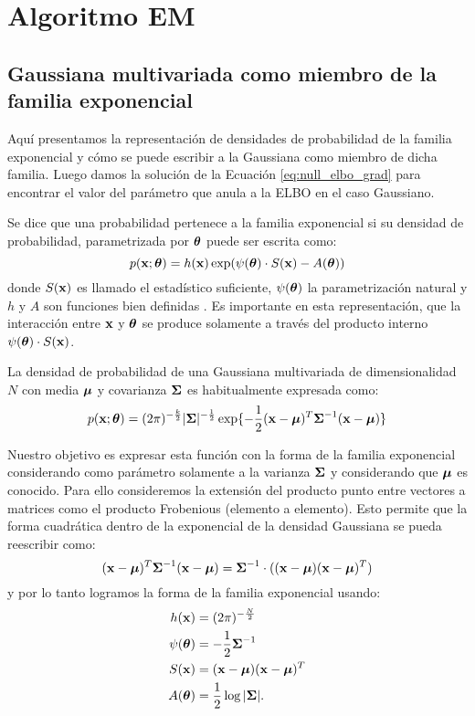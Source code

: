 \chapter{Algoritmo EM}
\section{Gaussiana multivariada como miembro de la familia exponencial}\label{appendix:exp_family}

Aquí presentamos la representación de densidades de probabilidad de la familia exponencial y cómo se puede escribir a la Gaussiana como miembro de dicha familia. Luego damos la solución de la Ecuación \ref{eq:null_elbo_grad} para encontrar el valor del parámetro que anula a la ELBO en el caso Gaussiano.

Se dice que una probabilidad pertenece a la familia exponencial si su densidad de probabilidad, parametrizada por $\mbox{\boldmath$ \theta $}$ puede ser escrita como:
$$p(\mathbf{x}; \mbox{\boldmath$ \theta $}) = h(\mathbf{x}) \exp(\psi(\mbox{\boldmath$ \theta $}) \cdot S(\mathbf{x}) - A(\mbox{\boldmath$ \theta $}))$$
donde $S(\mathbf{x})$ es llamado el estadístico suficiente, $\psi(\mbox{\boldmath$ \theta $})$ la parametrización natural y $h$ y $A$ son funciones bien definidas \citep{Wasserman2004}. Es importante en esta representación, que la interacción entre $\mathbf{x}$ y $\mbox{\boldmath$ \theta $}$ se produce solamente a través del producto interno $\psi(\mbox{\boldmath$ \theta $})\cdot S(\mathbf{x})$. 

La densidad de probabilidad de una Gaussiana multivariada de dimensionalidad $N$ con media $\mbox{\boldmath$ \mu $}$ y covarianza $\mbox{\boldmath$ \Sigma $}$ es habitualmente expresada como:
$$p(\mathbf{x}; \mbox{\boldmath$ \theta $}) = (2\pi)^{-\frac{k}{2}} |\mbox{\boldmath$ \Sigma $}|^{-\frac{1}{2}} \exp \{ - \frac{1}{2}(\mathbf{x}- \mbox{\boldmath$ \mu $})^T \mbox{\boldmath$ \Sigma $}^{-1}(\mathbf{x}-\mbox{\boldmath$ \mu $}) \}$$

Nuestro objetivo es expresar esta función con la forma de la familia exponencial considerando como parámetro solamente a la varianza $\mbox{\boldmath$ \Sigma $}$ y considerando que $\mbox{\boldmath$ \mu $}$ es conocido. Para ello consideremos la extensión del producto punto entre vectores a matrices como el producto Frobenious (elemento a elemento). Esto permite que la forma cuadrática dentro de la exponencial de la densidad Gaussiana se pueda reescribir como:
$$(\mathbf{x}- \mbox{\boldmath$ \mu $})^T \mbox{\boldmath$ \Sigma $}^{-1}(\mathbf{x}-\mbox{\boldmath$ \mu $}) = \mbox{\boldmath$ \Sigma $}^{-1} \cdot ((\mathbf{x}- \mbox{\boldmath$ \mu $}) (\mathbf{x}-\mbox{\boldmath$ \mu $})^T)$$
y por lo tanto logramos la forma de la familia exponencial usando:
\begin{align*}
    h(\mathbf{x}) &= (2\pi)^{-\frac{N}{2}} \\
    \psi(\mbox{\boldmath$ \theta $}) &=  -\frac{1}{2}\mbox{\boldmath$ \Sigma $}^{-1} \\ 
    S(\mathbf{x}) &= (\mathbf{x}- \mbox{\boldmath$ \mu $}) (\mathbf{x}-\mbox{\boldmath$ \mu $})^T \\
    A(\mbox{\boldmath$ \theta $}) &= \frac{1}{2} \log |\mbox{\boldmath$ \Sigma $}|.
\end{align*} 

